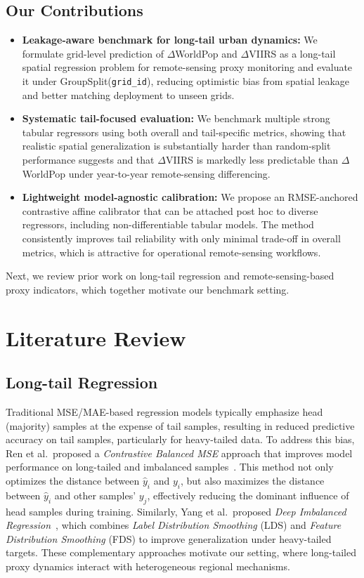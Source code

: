 \documentclass[preprint,12pt]{elsarticle}
\begin{document}
\subsection{Our Contributions}
\begin{itemize}
    \item \textbf{Leakage-aware benchmark for long-tail urban dynamics:} We formulate grid-level prediction of $\Delta$WorldPop and $\Delta$VIIRS as a long-tail spatial regression problem for remote-sensing proxy monitoring and evaluate it under GroupSplit(\texttt{grid\_id}), reducing optimistic bias from spatial leakage and better matching deployment to unseen grids.

    \item \textbf{Systematic tail-focused evaluation:} We benchmark multiple strong tabular regressors using both overall and tail-specific metrics, showing that realistic spatial generalization is substantially harder than random-split performance suggests and that $\Delta$VIIRS is markedly less predictable than $\Delta$WorldPop under year-to-year remote-sensing differencing.

    \item \textbf{Lightweight model-agnostic calibration:} We propose an RMSE-anchored contrastive affine calibrator that can be attached post hoc to diverse regressors, including non-differentiable tabular models. The method consistently improves tail reliability with only minimal trade-off in overall metrics, which is attractive for operational remote-sensing workflows.
\end{itemize}

Next, we review prior work on long-tail regression and remote-sensing-based proxy indicators, which together motivate our benchmark setting.

\section{Literature Review}
\subsection{Long-tail Regression}

Traditional MSE/MAE-based regression models typically emphasize head (majority) samples at the expense of tail samples, resulting in reduced predictive accuracy on tail samples, particularly for heavy-tailed data. To address this bias, Ren et al.\ proposed a \emph{Contrastive Balanced MSE} approach that improves model performance on long-tailed and imbalanced samples~\cite{ren2022balancedmse}. This method not only optimizes the distance between $\hat{y}_i$ and $y_i$, but also maximizes the distance between $\hat{y}_i$ and other samples' $y_j$, effectively reducing the dominant influence of head samples during training. Similarly, Yang et al.\ proposed \emph{Deep Imbalanced Regression}~\cite{yang2021dir}, which combines \emph{Label Distribution Smoothing} (LDS) and \emph{Feature Distribution Smoothing} (FDS) to improve generalization under heavy-tailed targets. These complementary approaches motivate our setting, where long-tailed proxy dynamics interact with heterogeneous regional mechanisms.
\end{document}
